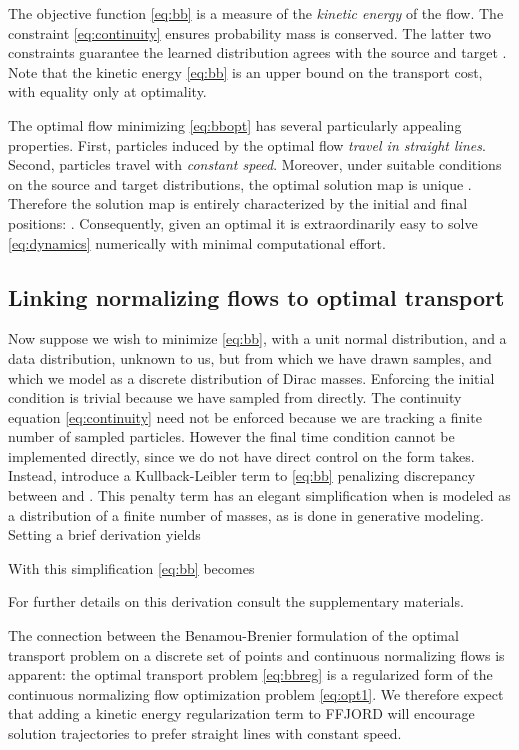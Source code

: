 \documentclass{article}
\theoremstyle{definition}
\theoremstyle{remark}
\begin{document}
The objective function \eqref{eq:bb} is a measure of the \emph{kinetic energy}
of the flow. The constraint \eqref{eq:continuity} ensures probability mass is
conserved. The latter two constraints guarantee the learned distribution agrees
with the source  and target .
Note that the kinetic energy \eqref{eq:bb} is an upper bound on the transport
  cost, with equality only at optimality.

The optimal flow  minimizing \eqref{eq:bbopt} has several particularly appealing
properties. First, particles induced by the optimal flow  \emph{travel in
straight lines}. Second, particles travel with \emph{constant speed}. Moreover, under suitable conditions on the source and target distributions, the optimal solution map is unique \cite{villani2008optimal}.
Therefore the solution map  is entirely characterized by the initial
and final positions:  . Consequently, given an optimal  it is extraordinarily easy to solve
\eqref{eq:dynamics} numerically with minimal computational effort.

\subsection{Linking normalizing flows to optimal transport}\label{sec:link}
Now suppose we wish to minimize \eqref{eq:bb}, with  a unit normal distribution,
and  a data distribution,
unknown to us, but from which we have drawn  samples, and which we model as a
discrete distribution of Dirac masses.
Enforcing the initial condition is trivial because we have sampled
from  directly.
The continuity equation \eqref{eq:continuity} need not be enforced because we are tracking a finite
number of sampled particles.
However the final time condition  cannot be implemented
directly, since we do not have direct control on the form 
takes. Instead, introduce a Kullback-Leibler term
to \eqref{eq:bb} penalizing discrepancy between  and . This penalty
term has an elegant simplification when  is modeled as a distribution of
a finite number of masses, as is done in generative modeling. Setting  a brief derivation yields

With this simplification
\eqref{eq:bb} becomes

For further details on this derivation consult the supplementary materials.

The connection between the Benamou-Brenier formulation of the optimal transport
problem on a discrete set of points and continuous normalizing flows is apparent:
the optimal transport problem \eqref{eq:bbreg} is a regularized form of the continuous
normalizing flow optimization problem \eqref{eq:opt1}. We therefore expect that adding a kinetic
energy regularization term to FFJORD will encourage solution trajectories to
prefer straight lines with constant speed. 
\end{document}
